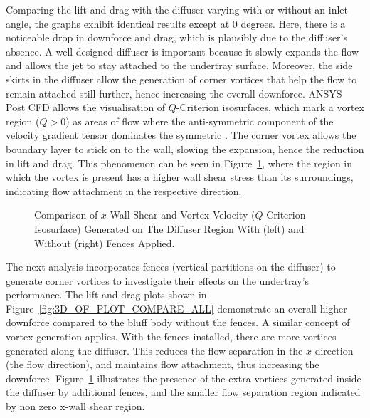 \noindent Comparing the lift and drag with the diffuser varying with or without an inlet angle, the graphs exhibit identical results except at 0 degrees. Here, there is a noticeable drop in downforce and drag, which is plausibly due to the diffuser's absence. A well-designed diffuser is important because it slowly expands the flow and allows the jet to stay attached to the undertray surface. Moreover, the side skirts in the diffuser allow the generation of corner vortices that help the flow to remain attached still further, hence increasing the overall downforce. ANSYS Post CFD allows the visualisation of $Q$-Criterion isosurfaces, which mark a vortex region ($Q > 0$) as areas of flow where the anti-symmetric component of the velocity gradient tensor dominates the symmetric \cite{Holmen2012MethodsIdentification}. The corner vortex allows the boundary layer to stick on to the wall, slowing the expansion, hence the reduction in lift and drag. This phenomenon can be seen in Figure~\ref{fig:3D_OF_COMPARE_FENCES_SHEAR}, where the region in which the vortex is present has a higher wall shear stress than its surroundings, indicating flow attachment in the respective direction.

\begin{figure}[!htb]
    \centering
    \noindent{}
    \caption{Comparison of $x$ Wall-Shear and Vortex Velocity ($Q$-Criterion Isosurface) Generated on The Diffuser Region With (left) and Without (right) Fences Applied.}
      \label{fig:3D_OF_COMPARE_FENCES_SHEAR}
\end{figure}

\noindent The next analysis incorporates fences (vertical partitions on the diffuser) to generate corner vortices to investigate their effects on the undertray's performance. The lift and drag plots shown in Figure~\ref{fig:3D_OF_PLOT_COMPARE_ALL} demonstrate an overall higher downforce compared to the bluff body without the fences. A similar concept of vortex generation applies. With the fences installed, there are more vortices generated along the diffuser. This reduces the flow separation in the $x$ direction (the flow direction), and maintains flow attachment, thus increasing the downforce. Figure~\ref{fig:3D_OF_COMPARE_FENCES_SHEAR} illustrates the presence of the extra vortices generated inside the diffuser by additional fences, and the smaller flow separation region indicated by non zero x-wall shear region. 

